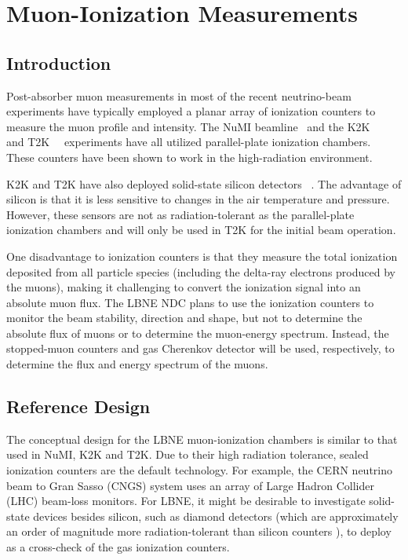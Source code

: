 \section{Muon-Ionization Measurements}

\subsection{Introduction}

Post-absorber muon measurements in most of the recent neutrino-beam
experiments have typically employed a planar array of ionization
counters to measure the muon profile and intensity. The 
NuMI beamline~\cite{ref:NuMIBeamMonitors} and the K2K~\cite{ref:K2K}~\cite{ref:Maruyama}
and T2K~\cite{ref:T2KMuIon}~\cite{ref:T2KMuMon} experiments have all
utilized parallel-plate ionization chambers. These counters have been
shown to work in the high-radiation environment. 

K2K and T2K have also
deployed solid-state silicon detectors~\cite{ref:Maruyama}
\cite{ref:RD42A}. The advantage of silicon is that it is less
sensitive to changes in the air temperature and pressure. However, these %
sensors are not as radiation-tolerant as the parallel-plate ionization 
chambers and will only be used in T2K for the initial
beam operation. 

One disadvantage to ionization counters is that they
measure the total ionization deposited from all particle species
(including the delta-ray electrons produced by the muons), making it
challenging to convert the ionization signal into an absolute
muon flux. The LBNE NDC plans to use the ionization counters to monitor
the beam stability, direction and shape, 
but not to determine the
absolute flux of muons or to determine the muon-energy spectrum. Instead, the
stopped-muon counters %
and gas Cherenkov detector %
 will be used, respectively, to determine the flux and energy
spectrum of the muons. 

\subsection{Reference Design}

The conceptual design for the LBNE muon-ionization chambers is similar
to that used in NuMI, K2K and T2K.  Due to their high radiation
tolerance, sealed ionization counters are the default technology.  For
example, the CERN neutrino beam to Gran Sasso (CNGS) 
system uses an array of Large Hadron Collider (LHC) 
 beam-loss monitors. For LBNE, it might be desirable to investigate solid-state devices
besides silicon, such as diamond detectors (which are approximately an
order of magnitude more radiation-tolerant than silicon counters
\cite{ref:RD42A}\cite{ref:K2KMuDecayMon} ), to deploy as a cross-check of the gas
ionization counters.

